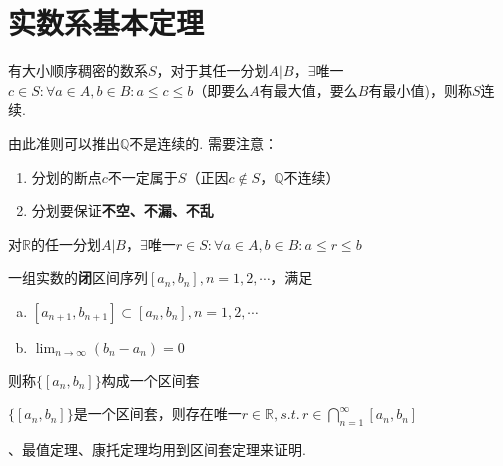 
\section{实数系基本定理}
\begin{definition}
有大小顺序稠密的数系$S$，对于其任一分划$A|B$，$\exists$唯一$c\in S:\forall a\in A,b\in B:a\leq c\leq b$（即要么$A$有最大值，要么$B$有最小值)，则称$S$连续. 
\end{definition}
由此准则可以推出$\mathbb{Q}$不是连续的. 需要注意：
\begin{enumerate}
	\itemsep -3pt
	\item 分划的断点$c$不一定属于$S$（正因$c\notin S$，$\mathbb{Q}$不连续）
	\item 分划要保证\textbf{不空、不漏、不乱}
\end{enumerate}
\begin{theorem}[实数基本定理]
对$\mathbb{R}$的任一分划$A|B$，$\exists$唯一$r\in S:\forall a\in A,b\in B:a\leq r\leq b$
\end{theorem}
\begin{definition}[区间套]
一组实数的\textbf{闭}区间序列$[a_n,b_n],n=1,2,\cdots$，满足
\begin{enumerate}[a.]
	\item $[a_{n+1},b_{n+1}]\subset[a_n,b_n],n=1,2,\cdots$
	\item $\displaystyle\lim_{n\to\infty}(b_n-a_n)=0$
\end{enumerate}
则称$\{[a_n,b_n]\}$构成一个区间套
\end{definition}
\begin{theorem}[区间套定理]
$\{[a_n,b_n]\}$是一个区间套，则存在唯一$\displaystyle r\in\mathbb{R},s.t.\,r\in\bigcap_{n=1}^{\infty}[a_n,b_n]$
\end{theorem}
、最值定理、康托定理均用到区间套定理来证明.